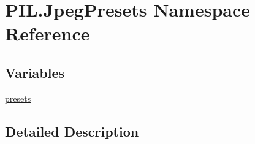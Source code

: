 \hypertarget{namespacePIL_1_1JpegPresets}{}\section{P\+I\+L.\+Jpeg\+Presets Namespace Reference}
\label{namespacePIL_1_1JpegPresets}
\subsection*{Variables}
\begin{DoxyCompactItemize}
\item 
\hyperlink{namespacePIL_1_1JpegPresets_a62cd20cbe4924d2aefdb8d296168a099}{presets}
\end{DoxyCompactItemize}


\subsection{Detailed Description}
